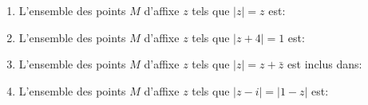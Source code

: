 \begin{exercice}
\begin{enumerate}
\item L'ensemble des points $M$  d'affixe $z$ tels que $|z|=z$ est:
\\\noindent
{}
\item L'ensemble des points $M$  d'affixe $z$ tels que $|z+4|=1$ est: 
\\\noindent{}
\item L'ensemble des points $M$  d'affixe $z$ tels que $|z|=z+\bar{z}$
  est inclus dans: 
\\\noindent{}
\item L'ensemble des points $M$  d'affixe $z$ tels que $|z-i|=|1-z|$ est: 
\\\noindent{}
\end{enumerate}
 
\end{exercice}
